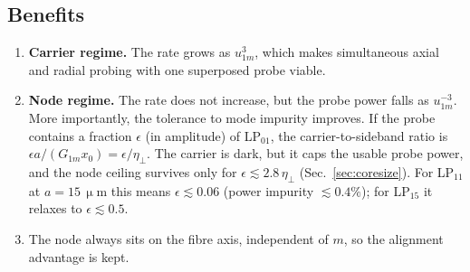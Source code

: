 \documentclass[11pt,a4paper]{article}
\newcommand{\micrometre}{\upmu m}\newcommand{\microkelvin}{\upmu K}
\newcommand{\SI}[2]{\ensuremath{#1\,\mathrm{#2}}}
\newcommand{\etaeff}{\eta_{\perp}}
\begin{document}
\subsection{Benefits}
\begin{enumerate}
\item \textbf{Carrier regime.} The rate grows as $u_{1m}^3$, which makes simultaneous axial and radial probing with one superposed probe viable.
\item \textbf{Node regime.} The rate does not increase, but the probe power falls as $u_{1m}^{-3}$. More importantly, the tolerance to mode impurity improves. If the probe contains a fraction $\epsilon$ (in amplitude) of LP$_{01}$, the carrier-to-sideband ratio is $\epsilon a/(G_{1m}x_0)=\epsilon/\etaeff$. The carrier is dark, but it caps the usable probe power, and the node ceiling survives only for $\epsilon\lesssim2.8\,\etaeff$ (Sec.~\ref{sec:coresize}). For LP$_{11}$ at $a=\SI{15}{\micrometre}$ this means $\epsilon\lesssim0.06$ (power impurity $\lesssim0.4\%$); for LP$_{15}$ it relaxes to $\epsilon\lesssim0.5$.
\item The node always sits on the fibre axis, independent of $m$, so the alignment advantage is kept.
\end{enumerate}
\end{document}
